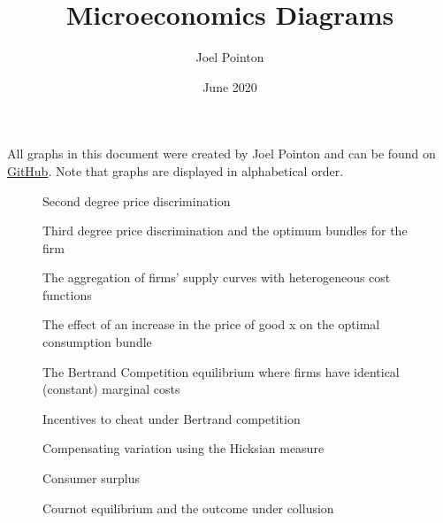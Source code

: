 \documentclass{article}
\title{Microeconomics Diagrams}
\author{Joel Pointon}
\date{June 2020}
\begin{document}
\maketitle
All graphs in this document were created by Joel Pointon and can be found on \href{https://github.com/pointonjoel/TeXonomics}{GitHub}. Note that graphs are displayed in alphabetical order.

\listoffigures

\begin{figure}[H]
    \centering
    
    \caption{Second degree price discrimination}
    \label{fig:1}
\end{figure}
\begin{figure}[H]
    \centering
    
    \caption{Third degree price discrimination and the optimum bundles for the firm}
    \label{fig:2}
\end{figure}
\begin{figure}[H]
    \centering
    
    \caption{The aggregation of firms' supply curves with heterogeneous cost functions}
    \label{fig:3}
\end{figure}
\begin{figure}[H]
    \centering
    
    \caption{The effect of an increase in the price of good x on the optimal consumption bundle}
    \label{fig:4}
\end{figure}
\begin{figure}[H]
    \centering
    
    \caption{The Bertrand Competition equilibrium where firms have identical (constant) marginal  costs}
    \label{fig:5}
\end{figure}
\begin{figure}[H]
    \centering
    
    \caption{Incentives to cheat under Bertrand competition}
    \label{fig:6}
\end{figure}
\begin{figure}[H]
    \centering
    
    \caption{Compensating variation using the Hicksian measure}
    \label{fig:7}
\end{figure}
\begin{figure}[H]
    \centering
    
    \caption{Consumer surplus}
    \label{fig:8}
\end{figure}
\begin{figure}[H]
    \centering
    
    \caption{Cournot equilibrium and the outcome under collusion}
    \label{fig:9}
\end{figure}
\end{document}
